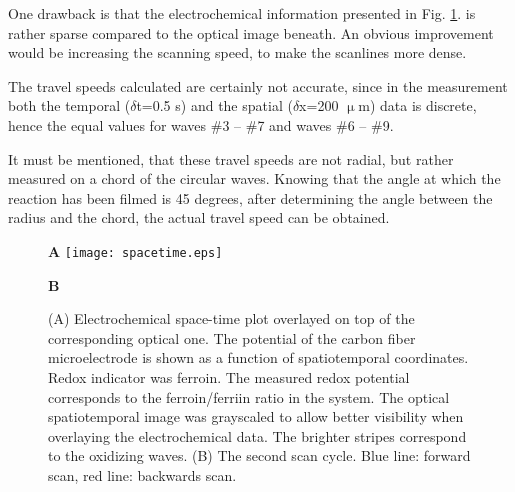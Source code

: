 \documentclass[3p]{elsarticle}
\begin{document}
One drawback is that the electrochemical information presented in Fig. \ref{fig:spatiotemporal}. is rather sparse compared to the optical image beneath.
An obvious improvement would be increasing the scanning speed, to make the scanlines more dense.

The travel speeds calculated are certainly not accurate, since in the measurement both the temporal ($\delta$t=0.5 s) and the spatial ($\delta$x=200 $\upmu$m) data is discrete, hence the equal values for waves \#3 -- \#7 and waves \#6 -- \#9.

It must be mentioned, that these travel speeds are not radial, but rather measured on a chord of the circular waves.
Knowing that the angle at which the reaction has been filmed is 45 degrees, after determining the angle between the radius and the chord, the actual travel speed can be obtained.

\def\s{0.5}
\begin{figure}
\hspace{4cm} \textbf{\large{A}}
\texttt{[image: spacetime.eps]}
\vspace{1cm}

\hspace{4cm} \textbf{\large{B}}

\centering
{}
\caption{(A) Electrochemical space-time plot overlayed on top of the corresponding optical one.
The potential of the carbon fiber microelectrode is shown as a function of spatiotemporal coordinates.
Redox indicator was ferroin.
The measured redox potential corresponds to the ferroin/ferriin ratio in the system.
The optical spatiotemporal image was grayscaled to allow better visibility when overlaying the electrochemical data.
The brighter stripes correspond to the oxidizing waves.
(B) The second scan cycle.
Blue line: forward scan, red line: backwards scan.
}
\label{fig:spatiotemporal}
\end{figure}
\end{document}
